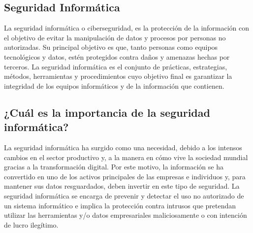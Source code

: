 \documentclass[12pt]{article}
\begin{document}
\subsection*{Seguridad Informática}
La seguridad informática o ciberseguridad, es la protección de la información con el objetivo de evitar la manipulación de datos y procesos por personas no autorizadas. Su principal objetivo es que, tanto personas como equipos tecnológicos y datos, estén protegidos contra daños y amenazas hechas por terceros.
La seguridad informática es el conjunto de prácticas, estrategias, métodos, herramientas y procedimientos cuyo objetivo final es garantizar la integridad de los equipos informáticos y de la información que contienen.

\subsection*{¿Cuál es la importancia de la seguridad informática?}
La seguridad informática ha surgido como una necesidad, debido a los intensos cambios en el sector productivo y, a la manera en cómo vive la sociedad mundial gracias a la transformación digital.
Por este motivo, la información se ha convertido en uno de los activos principales de las empresas e individuos y, para mantener sus datos resguardados, deben invertir en este tipo de seguridad.
La seguridad informática se encarga de prevenir y detectar el uso no autorizado de un sistema informático e implica la protección contra intrusos que pretendan utilizar las herramientas y/o datos empresariales maliciosamente o con intención de lucro ilegítimo.
\end{document}
